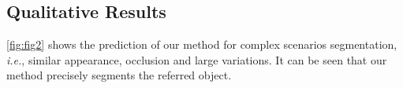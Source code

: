 \documentclass[10pt,twocolumn,letterpaper]{article}
\begin{document}
\subsection{Qualitative Results}
\cref{fig:fig2} shows the prediction of our method for complex scenarios segmentation, \textit{i.e.}, similar appearance, occlusion and large variations.
It can be seen that our method precisely segments the referred object.

{\small


}
\end{document}
